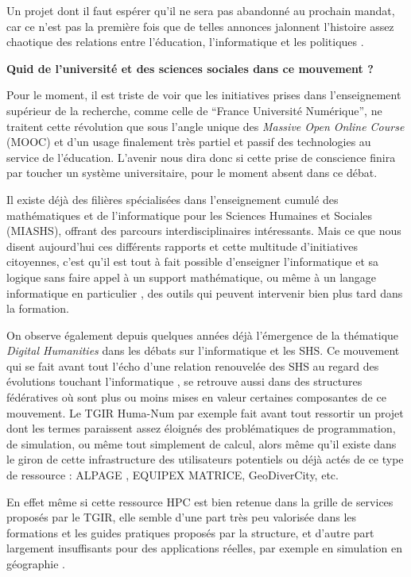 Un projet dont il faut espérer qu'il ne sera pas abandonné au prochain mandat, car ce n'est pas la première fois que de telles annonces jalonnent l'histoire assez chaotique des relations entre l'éducation, l'informatique et les politiques .

\textbf{Quid de l'université et des sciences sociales dans ce mouvement ?}

Pour le moment, il est triste de voir que les initiatives prises dans l'enseignement supérieur de la recherche, comme celle de \enquote{France Université Numérique}, ne traitent cette révolution que sous l'angle unique des \textit{Massive Open Online Course} (MOOC) et d'un usage finalement très partiel et passif des technologies au service de l'éducation. L'avenir nous dira donc si cette prise de conscience finira par toucher un système universitaire, pour le moment absent dans ce débat.

Il existe déjà des filières spécialisées dans l'enseignement cumulé des mathématiques et de l'informatique pour les Sciences Humaines et Sociales (MIASHS), offrant des parcours interdisciplinaires intéressants. Mais ce que nous disent aujourd'hui ces différents rapports et cette multitude d'initiatives citoyennes, c'est qu'il est tout à fait possible d'enseigner l'informatique et sa logique sans faire appel à un support mathématique, ou même à un langage informatique en particulier , des outils qui peuvent intervenir bien plus tard dans la formation.

On observe également depuis quelques années déjà l'émergence de la thématique \textit{Digital Humanities} dans les débats sur l'informatique et les SHS. Ce mouvement  qui se fait avant tout l'écho d'une relation renouvelée des SHS au regard des évolutions touchant l'informatique , se retrouve aussi dans des structures fédératives où sont plus ou moins mises en valeur certaines composantes de ce mouvement. Le TGIR Huma-Num par exemple fait avant tout ressortir un projet dont les termes  paraissent assez éloignés des problématiques de programmation, de simulation, ou même tout simplement de calcul, alors même qu'il existe dans le giron de cette infrastructure des utilisateurs potentiels ou déjà actés de ce type de ressource : ALPAGE \autocite{Costa2012}, EQUIPEX MATRICE, GeoDiverCity, etc.

En effet même si cette ressource HPC est bien retenue dans la grille de services proposés par le TGIR, elle semble d'une part très peu valorisée dans les formations et les guides pratiques proposés par la structure, et d'autre part largement insuffisants pour des applications réelles, par exemple en simulation en géographie .

